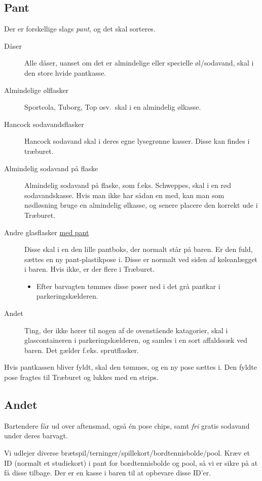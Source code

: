 \subsection{Pant}
\label{sec:intra:pant}

Der er forskellige slags \textit{pant}, og det skal sorteres.
\begin{description}
    \item[Dåser] Alle dåser, uanset om det er almindelige eller specielle
        øl/sodavand, skal i den store hvide pantkasse.
    \item[Almindelige ølflasker] Sportcola, Tuborg, Top osv.\ skal i en almindelig ølkasse.
    \item[Hancock sodavandsflasker] Hancock sodavand skal i deres egne lysegrønne kasser. Disse kan findes i træburet.
    \item[Almindelig sodavand på flaske] Almindelig sodavand på flaske, som f.eks. Schweppes, skal i en
    rød sodavandskasse. Hvis man ikke har sådan en med, kan man som
    nødløsning bruge en almindelig ølkasse, og senere placere den korrekt ude i Træburet.
    \item[Andre glasflasker \underline{med pant}] Disse skal i en den lille pantboks, der normalt står på baren.
    Er den fuld, sættes en ny pant-plastikpose i. Disse er normalt ved siden af køleanlægget i baren. 
    Hvis ikke, er der flere i Træburet.
    \begin{itemize}
        \item Efter barvagten tømmes disse poser ned i det grå pantkar i parkeringskælderen.
    \end{itemize}
    \item[Andet] Ting, der ikke hører til nogen af de ovenstående
    katagorier, skal i glascontaineren i parkeringskælderen,
    og samles i en sort affaldssæk ved baren. Det gælder f.eks. sprutflasker.
\end{description}

Hvis pantkassen bliver fyldt, skal den tømmes, og en ny pose sættes i. 
Den fyldte pose fragtes til Træburet og lukkes med en strips.

\subsection{Andet}
\label{sec:intra:andet}

Bartendere får ud over aftensmad, også én pose chips, samt \textit{fri} gratis
sodavand under deres barvagt.

Vi udlejer diverse brætspil/terninger/spillekort/bordtennisbolde/pool. 
Kræv et ID (normalt et studiekort) i pant for bordtennisbolde og pool, 
så vi er sikre på at få disse tilbage. 
Der er en kasse i baren til at opbevare disse ID'er.

